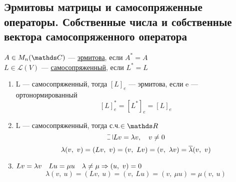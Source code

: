 \documentclass[main]{subfiles}
\begin{document}
    \newpage
    \subsection{Эрмитовы матрицы и самосопряженные операторы. Собственные числа и собственные вектора самосопряженного оператора}
    \begin{definition}
        $A \in M_n (\CC)$ --- \ul{эрмитова}, если $A^* = A$\\
        $L \in \mathscr{L}(V)$ --- \ul{самосопряженный}, если $L^* = L$
    \end{definition}

    \begin{properties}
        \begin{enumerate}
            \item L --- самосопряженный, тогда $[L]_e$ --- эрмитова, если e --- ортонормированный
                \[[L]_e^* = [L^*]_e = [L]_e\]
            \item L --- самосопряженный, тогда с.ч.$\in \R$
                \[\letus Lv = \lambda v,\q v \neq 0\]
                \[\lambda(v,\ v) = (Lv,\ v) = (v,\ Lv) = (v,\ \lambda v) = \ol{\lambda} (v,\ v)\]
            \item $Lv = \lambda v\quad Lu = \mu u \quad \lambda \neq \mu \Rightarrow (u,\ v) = 0$
                \[\lambda (v,\ u) = (Lv,\ u) = (v,\ Lu) = (v,\ \mu u) = \mu (v,\ u)\]
        \end{enumerate}
    \end{properties}
\end{document}

